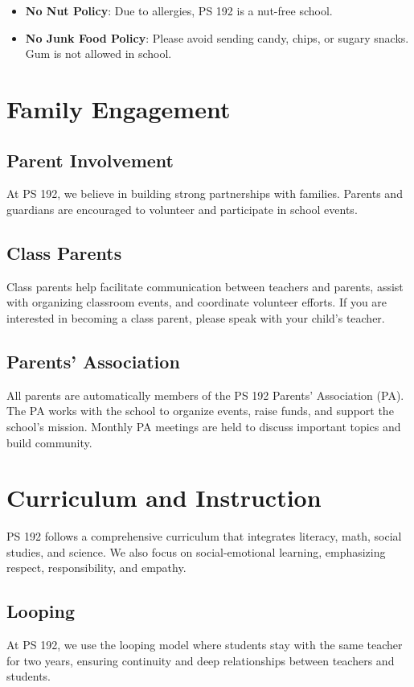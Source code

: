 \documentclass[11pt]{article}
\begin{document}
\begin{itemize}
\item \textbf{\textbf{No Nut Policy}}: Due to allergies, PS 192 is a nut-free school.
\item \textbf{\textbf{No Junk Food Policy}}: Please avoid sending candy, chips, or sugary snacks. Gum is not allowed in school.
\end{itemize}

\section{Family Engagement}
\label{sec:org20620d2}
\subsection{Parent Involvement}
\label{sec:orgfeded68}
At PS 192, we believe in building strong partnerships with families. Parents and guardians are encouraged to volunteer and participate in school events.

\subsection{Class Parents}
\label{sec:org7d7c842}
Class parents help facilitate communication between teachers and parents, assist with organizing classroom events, and coordinate volunteer efforts. If you are interested in becoming a class parent, please speak with your child's teacher.

\subsection{Parents’ Association}
\label{sec:orgbcdc52f}
All parents are automatically members of the PS 192 Parents’ Association (PA). The PA works with the school to organize events, raise funds, and support the school's mission. Monthly PA meetings are held to discuss important topics and build community.

\section{Curriculum and Instruction}
\label{sec:org1573ebd}
PS 192 follows a comprehensive curriculum that integrates literacy, math, social studies, and science. We also focus on social-emotional learning, emphasizing respect, responsibility, and empathy.

\subsection{Looping}
\label{sec:orgefeaa5a}
At PS 192, we use the looping model where students stay with the same teacher for two years, ensuring continuity and deep relationships between teachers and students.
\end{document}
